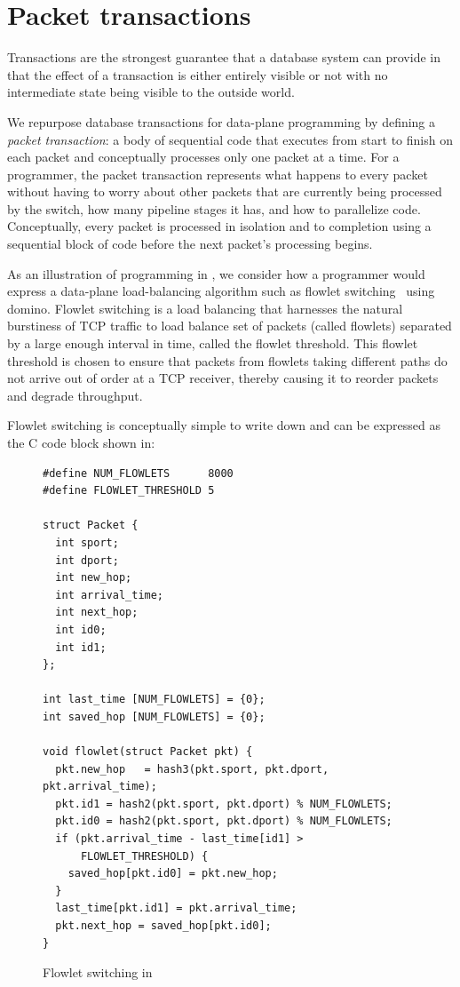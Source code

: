 \section{Packet transactions}
Transactions are the strongest guarantee that a database system can provide in
that the effect of a transaction is either entirely visible or not with no
intermediate state being visible to the outside world.

We repurpose database transactions for data-plane programming by defining a
\textit{packet transaction}: a body of sequential code that executes from start
to finish on each packet and conceptually processes only one packet at a time.
For a programmer, the packet transaction represents what happens to every
packet without having to worry about other packets that are currently being
processed by the switch, how many pipeline stages it has, and how to
parallelize code. Conceptually, every packet is processed in isolation and to
completion using a sequential block of code before the next packet's processing
begins.

As an illustration of programming in \pktlanguage, we consider how a programmer
would express a data-plane load-balancing algorithm such as flowlet
switching~\cite{flowlet} using domino. Flowlet switching is a load balancing
that harnesses the natural burstiness of TCP traffic to load balance set of
packets (called flowlets) separated by a large enough interval in time, called
the flowlet threshold. This flowlet threshold is chosen to ensure that packets
from flowlets taking different paths do not arrive out of order at a TCP
receiver, thereby causing it to reorder packets and degrade throughput.

Flowlet switching is conceptually simple to write down and can be expressed
as the C code block shown in:
\begin{figure}[!h]
\begin{tiny}
\begin{lstlisting}
#define NUM_FLOWLETS      8000
#define FLOWLET_THRESHOLD 5

struct Packet {
  int sport;
  int dport;
  int new_hop;
  int arrival_time;
  int next_hop;
  int id0;
  int id1;
};

int last_time [NUM_FLOWLETS] = {0};
int saved_hop [NUM_FLOWLETS] = {0};

void flowlet(struct Packet pkt) {
  pkt.new_hop   = hash3(pkt.sport, pkt.dport, pkt.arrival_time);
  pkt.id1 = hash2(pkt.sport, pkt.dport) % NUM_FLOWLETS;
  pkt.id0 = hash2(pkt.sport, pkt.dport) % NUM_FLOWLETS;
  if (pkt.arrival_time - last_time[id1] >
      FLOWLET_THRESHOLD) {
    saved_hop[pkt.id0] = pkt.new_hop;
  }
  last_time[pkt.id1] = pkt.arrival_time;
  pkt.next_hop = saved_hop[pkt.id0];
}
\end{lstlisting}
\end{tiny}
\caption{Flowlet switching in \pktlanguage}
\label{fig:flowlet}
\end{figure}

